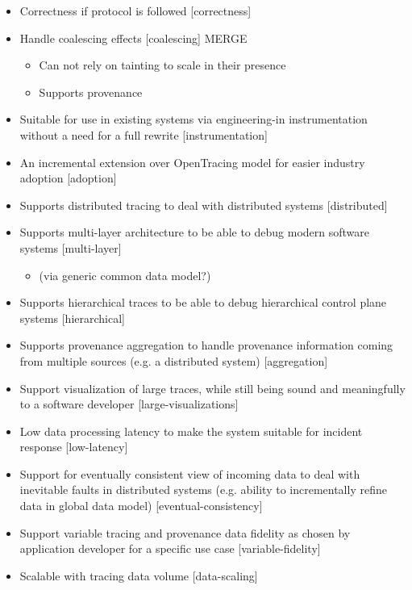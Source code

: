 \begin{itemize}
    \item Correctness if protocol is followed [correctness]
    \item Handle coalescing effects [coalescing] MERGE
    \begin{itemize}
        \item Can not rely on tainting to scale in their presence
        \item Supports provenance
    \end{itemize}
    \item Suitable for use in existing systems via engineering-in instrumentation without a need for a full rewrite [instrumentation]
    \item An incremental extension over OpenTracing model for easier industry adoption [adoption]
    \item Supports distributed tracing to deal with distributed systems [distributed]
    \item Supports multi-layer architecture to be able to debug modern software systems [multi-layer]
    \begin{itemize}
        \item  (via generic common data model?) 
    \end{itemize}
    \item Supports hierarchical traces to be able to debug hierarchical control plane systems [hierarchical]
    \item Supports provenance aggregation to handle provenance information coming from multiple sources (e.g. a distributed system) [aggregation]
    \item Support visualization of large traces, while still being sound and meaningfully to a software developer [large-visualizations]
    \item Low data processing latency to make the system suitable for incident response [low-latency]
    \item Support for eventually consistent view of incoming data to deal with inevitable faults in distributed systems (e.g. ability to incrementally refine data in global data model) [eventual-consistency]
    \item Support variable tracing and provenance data fidelity as chosen by application developer for a specific use case [variable-fidelity]
    \item Scalable with tracing data volume [data-scaling]
\end{itemize}


